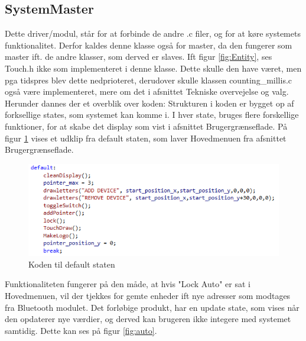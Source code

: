 \subsection{SystemMaster}
Dette driver/modul, står for at forbinde de andre .c filer, og for at køre systemets funktionalitet. Derfor kaldes denne klasse også for master, da den fungerer som master ift. de andre klasser, som derved er slaves. Ift figur \ref{fig:Entity}, ses Touch.h ikke som implementeret i denne klasse. Dette skulle den have været, men pga tidspres blev dette nedprioteret, derudover skulle klassen counting\_millis.c også være implementeret, mere om det i afsnittet Tekniske overvejelse og valg. 
Herunder dannes der et overblik over koden:
\newline
\newline
Strukturen i koden er bygget op af forksellige states, som systemet kan komme i. I hver state, bruges flere forskellige funktioner, for at skabe det display som vist i afsnittet Brugergrænseflade. På figur \ref{fig:dafaultkode} vises
et udklip fra default staten, som laver Hovedmenuen fra afsnittet Brugergrænseflade. 
\begin{figure}[H]
	\centering
	\includegraphics[width = 300 pt]{Img/dafaultkode.PNG}
	\caption{Koden til default staten}
	\label{fig:dafaultkode}
\end{figure}

Funktionaliteten fungerer på den måde, at hvis "Lock Auto" er sat i Hovedmenuen, vil der tjekkes for gemte enheder ift nye adresser som modtages fra Bluetooth modulet. Det forløbige produkt, har en update state, som vises når den opdaterer nye værdier, og derved kan brugeren ikke integere med systemet samtidig. Dette kan ses på figur \ref{fig:auto}.